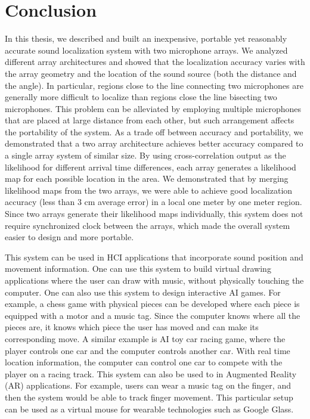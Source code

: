 \chapter{Conclusion}
In this thesis, we described and built an inexpensive, portable yet reasonably accurate sound localization system with two microphone arrays. We analyzed different array architectures and showed that the localization accuracy varies with the array geometry and the location of the sound source (both the distance and the angle). In particular, regions close to the line connecting two microphones are generally more difficult to localize than regions close the line bisecting two microphones. This problem can be alleviated by employing multiple microphones that are placed at large distance from each other, but such arrangement affects the portability of the system. As a trade off between accuracy and portability, we demonstrated that a two array architecture achieves better accuracy compared to a single array system of similar size. By using cross-correlation output as the likelihood for different arrival time differences, each array generates a likelihood map for each possible location in the area. We demonstrated that by merging likelihood maps from the two arrays, we were able to achieve good localization accuracy (less than $3$ cm average error) in a local one meter by one meter region. Since two arrays generate their likelihood maps individually, this system does not require synchronized clock between the arrays, which made the overall system easier to design and more portable.

This system can be used in HCI applications that incorporate sound position and movement information. One can use this system to build virtual drawing applications where the user can draw with music, without physically touching the computer. One can also use this system to design interactive AI games. For example, a chess game with physical pieces can be developed where each piece is equipped with a motor and a music tag. Since the computer knows where all the pieces are, it knows which piece the user has moved and can make its corresponding move. A similar example is AI toy car racing game, where the player controls one car and the computer controls another car. With real time location information, the computer can control one car to compete with the player on a racing track. This system can also be used to in Augmented Reality (AR) applications. For example, users can wear a music tag on the finger, and then the system would be able to track finger movement. This particular setup can be used as a virtual mouse for wearable technologies such as Google Glass. 

